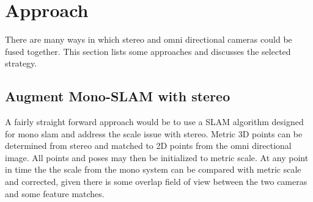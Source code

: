   

\section{Approach}

There are many ways in which stereo and omni directional cameras could be fused together.  This section lists some approaches and discusses the selected strategy.

\subsection{Augment Mono-SLAM with stereo}

A fairly straight forward approach would be to use a SLAM algorithm designed for mono slam and address the scale issue with stereo.  Metric 3D points can be determined from stereo and matched to 2D points from the omni directional image.  All points and poses may then be initialized to metric scale.  At any point in time the the scale from the mono system can be compared with metric scale and corrected, given there is some overlap field of view between the two cameras and some feature matches.

